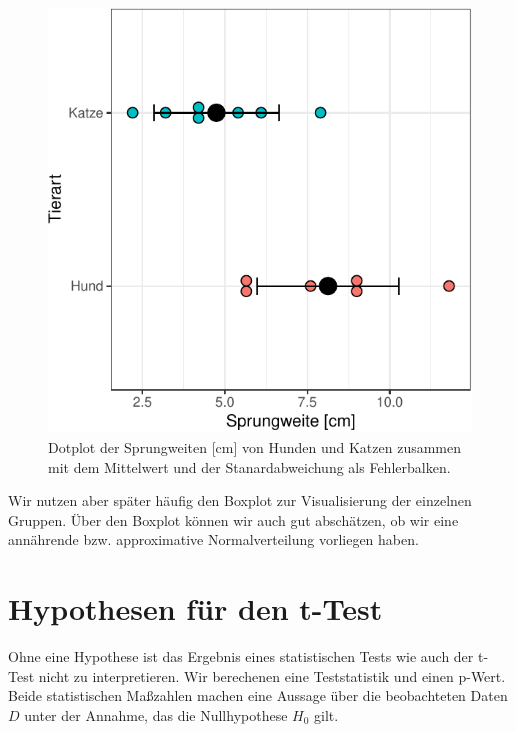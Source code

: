 \documentclass[
  letterpaper,
  DIV=11,
  oneside]{scrreport}
\begin{document}
\begin{figure}

{\centering \includegraphics{./stat-tests-ttest_files/figure-pdf/fig-dotplot-ttest-1.pdf}

}

\caption{\label{fig-dotplot-ttest}Dotplot der Sprungweiten {[}cm{]} von
Hunden und Katzen zusammen mit dem Mittelwert und der Stanardabweichung
als Fehlerbalken.}

\end{figure}

Wir nutzen aber später häufig den Boxplot zur Visualisierung der
einzelnen Gruppen. Über den Boxplot können wir auch gut abschätzen, ob
wir eine annährende bzw. approximative Normalverteilung vorliegen haben.

\hypertarget{hypothesen-fuxfcr-den-t-test}{%
\section{Hypothesen für den t-Test}\label{hypothesen-fuxfcr-den-t-test}}

Ohne eine Hypothese ist das Ergebnis eines statistischen Tests wie auch
der t-Test nicht zu interpretieren. Wir berechenen eine Teststatistik
und einen p-Wert. Beide statistischen Maßzahlen machen eine Aussage über
die beobachteten Daten \(D\) unter der Annahme, das die Nullhypothese
\(H_0\) gilt.
\end{document}
